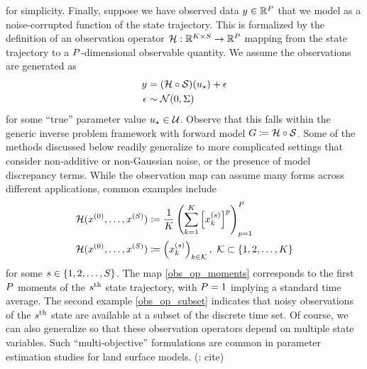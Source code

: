 \documentclass[12pt]{article}
\begin{document}
for simplicity. Finally, suppose we have observed data $\obs \in \R^{\dimObs}$ that we model as a
noise-corrupted function of the state trajectory. This is formalized by the definition of an observation operator 
$\obsOp: \R^{\NTimeStep \times \dimState} \to \R^{\dimObs}$ mapping from the state trajectory to a 
$\dimObs$-dimensional observable quantity. We assume the observations are generated as 
\begin{align}
\obs &= (\obsOp \circ \solutionOp)(\ParTrue) + \noise \\
\noise &\sim \Gaussian(0, \likPar) \nonumber 
\end{align}
for some ``true'' parameter value $\ParTrue \in \parSpace$. Observe that this falls within the generic 
inverse problem framework with forward model $\fwd \Def \obsOp \circ \solutionOp$. 
Some of the methods discussed below readily 
generalize to more complicated settings that consider non-additive or non-Gaussian noise, or the presence of 
model discrepancy terms. While the observation map can assume many forms across different applications, 
common examples include 
\begin{align}
\obsOp(\indexState[0]{\state}, \dots, \indexState[\dimState]{\state}) 
&\Def \frac{1}{\NTimeStep} \left(\sum_{\timeIndex=1}^{\NTimeStep} \left[\state^{(\stateIndex)}_{\timeIndex} \right]^{\idxObsDim} \right)_{\idxObsDim=1}^{\dimObs} \label{obs_op_moments} \\ 
\obsOp(\indexState[0]{\state}, \dots, \indexState[\dimState]{\state}) 
&\Def \left(\state^{(\stateIndex)}_{\timeIndex} \right)_{\timeIndex \in \mathcal{K}}, \ \mathcal{K} \subset \{1, 2, \dots, \NTimeStep\} \label{obs_op_subset}
\end{align} 
for some $\stateIndex \in \{1, 2, \dots, \dimState\}$. The map \ref{obs_op_moments} corresponds to the first $\dimObs$ moments of the 
$\stateIndex^{\text{th}}$ state trajectory, with $\dimObs=1$ implying a standard time average. The second example \ref{obs_op_subset}
indicates that noisy observations of the $\stateIndex^{\text{th}}$ state are available at a subset of the discrete time set. 
Of course, we can also generalize so that these observation operators depend on multiple state variables. Such ``multi-objective'' 
formulations are common in parameter estimation studies for land surface models. (\todo: cite)

\end{document}

